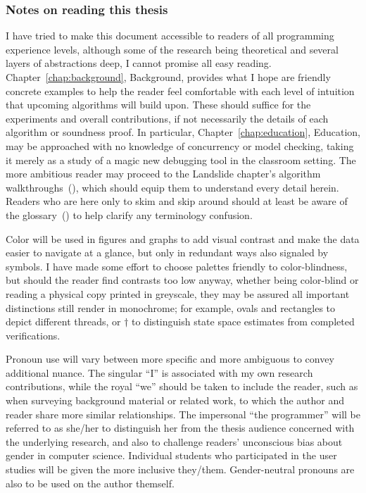 \subsubsection{Notes on reading this thesis}

I have tried to make this document accessible to readers of all programming experience levels,
although some of the research being theoretical and several layers of abstractions deep,
I cannot promise all easy reading.
Chapter~\ref{chap:background}, Background, provides what I hope are friendly concrete examples
to help the reader feel comfortable with each level of intuition that upcoming algorithms will build upon.
These should suffice for the experiments and overall contributions,
if not necessarily the details of each algorithm or soundness proof.
In particular, Chapter~\ref{chap:education}, Education,
may be approached with no knowledge of concurrency or model checking,
taking it merely as a study of a magic new debugging tool in the classroom setting.
The more ambitious reader may proceed to the Landslide chapter's algorithm walkthroughs~(\sect{\ref{sec:landslide-algs}}),
which should equip them to understand every detail herein.
Readers who are here only to skim and skip around should at least be aware of the glossary~(\sect{\ref{sec:glossary}})
to help clarify any terminology confusion.

Color will be used in figures and graphs to add visual contrast and make the data easier to navigate at a glance,
but only in redundant ways also signaled by symbols.
I have made some effort to choose palettes friendly to color-blindness,
but should the reader find contrasts too low anyway,
whether being color-blind or reading a physical copy printed in greyscale,
they may be assured all important distinctions still render in monochrome;
for example, ovals and rectangles to depict different threads,
or $\dagger$ to distinguish state space estimates from completed verifications.

Pronoun use will vary between more specific and more ambiguous to convey additional nuance.
The singular ``I'' is associated with my own research contributions,
while the royal ``we'' should be taken to include the reader,
such as when surveying background material or related work,
to which the author and reader share more similar relationships.
The impersonal ``the programmer'' will be referred to as she/her
to distinguish her from the thesis audience concerned with the underlying research,
and also to challenge readers' unconscious bias about gender in computer science.
Individual students who participated in the user studies will be given the more inclusive they/them.
Gender-neutral pronouns are also to be used on the author themself.

